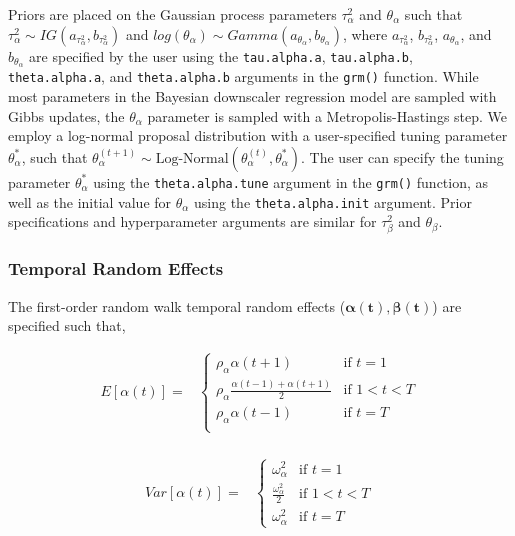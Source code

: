 \documentclass[12pt]{article}
\newcommand{\bs}{\boldsymbol}
\newcommand{\bl}{\mathbf}
\begin{document}
Priors are placed on the Gaussian process parameters $\tau_{\alpha}^2$ and $\theta_{\alpha}$ such that $\tau_{\alpha}^2 \sim IG(a_{\tau_{\alpha}^2}, b_{\tau_{\alpha}^2})$ and $log(\theta_{\alpha}) \sim Gamma(a_{\theta_{\alpha}}, b_{\theta_{\alpha}})$, where $a_{\tau_{\alpha}^2}$, $b_{\tau_{\alpha}^2}$, $a_{\theta_{\alpha}}$, and $b_{\theta_{\alpha}}$ are specified by the user using the \texttt{tau.alpha.a}, \texttt{tau.alpha.b}, \texttt{theta.alpha.a}, and \texttt{theta.alpha.b} arguments in the \texttt{grm()} function. 
While most parameters in the Bayesian downscaler regression model are sampled with Gibbs updates, the $\theta_{\alpha}$ parameter is sampled with a Metropolis-Hastings step. 
We employ a log-normal proposal distribution with a user-specified tuning parameter $\theta_{\alpha}^*$, such that $\theta_{\alpha}^{(t+1)} \sim \text{Log-Normal}(\theta_{\alpha}^{(t)}, \theta_{\alpha}^*)$.
The user can specify the tuning parameter $\theta_{\alpha}^*$ using the \texttt{theta.alpha.tune} argument in the \texttt{grm()} function, as well as the initial value for $\theta_{\alpha}$ using the \texttt{theta.alpha.init} argument.
Prior specifications and hyperparameter arguments are similar for $\tau_{\beta}^2$ and $\theta_{\beta}$.



\subsubsection*{Temporal Random Effects}

The first-order random walk temporal random effects ($\bs{\alpha}(\bl{t}), \bs{\beta}(\bl{t})$) are specified such that,

\begin{align*}
    E[\alpha(t)] =& 
    \begin{cases} 
        \rho_{\alpha} \alpha(t+1) & \text{if } t = 1 \\ 
        \rho_{\alpha} \frac{\alpha(t-1) + \alpha(t+1)}{2} & \text{if } 1 < t < T \\
        \rho_{\alpha} \alpha(t-1) & \text{if } t = T \\
    \end{cases} \\
\end{align*}

\begin{align*}
    Var[\alpha(t)] =& 
    \begin{cases} 
        \omega^2_{\alpha} & \text{if } t = 1 \\
        \frac{\omega^2_{\alpha}}{2} & \text{if } 1 < t < T \\
        \omega^2_{\alpha} & \text{if } t = T
    \end{cases} \\
\end{align*}
\end{document}
